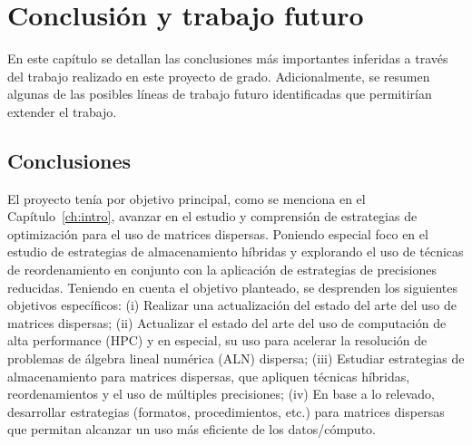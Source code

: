 \chapter{Conclusión y trabajo futuro}\label{ch:conclusion}

En este capítulo se detallan las conclusiones más importantes inferidas a través del trabajo realizado en este proyecto de grado. Adicionalmente, se resumen algunas de las posibles líneas de trabajo futuro identificadas que permitirían extender el trabajo.

\section{Conclusiones}
El proyecto tenía por objetivo principal, como se menciona en el Capítulo~\ref{ch:intro}, avanzar en el estudio y comprensión de estrategias de optimización para el uso de matrices dispersas. Poniendo especial foco en el estudio de estrategias de almacenamiento  híbridas y explorando el uso de técnicas de reordenamiento en conjunto con la aplicación de estrategias de precisiones reducidas.
Teniendo en cuenta el objetivo planteado, se desprenden los siguientes objetivos específicos: 
(i) Realizar una actualización del estado del arte del uso de matrices dispersas;
(ii) Actualizar el estado del arte del uso de computación de alta performance (HPC) y en especial, su uso para acelerar la resolución de problemas de álgebra lineal numérica (ALN) dispersa;
(iii) Estudiar estrategias de almacenamiento para matrices dispersas, que apliquen técnicas híbridas, reordenamientos y el uso de múltiples precisiones;
(iv) En base a lo relevado, desarrollar estrategias (formatos, procedimientos, etc.) para matrices dispersas que permitan alcanzar un uso más eficiente de los datos/cómputo.

